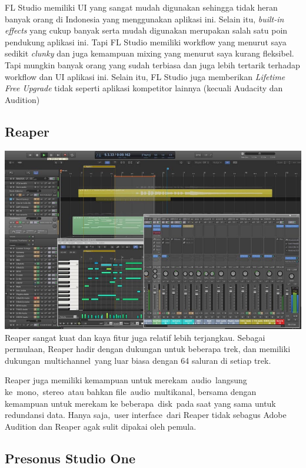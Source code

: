FL Studio memiliki UI yang sangat mudah digunakan sehingga tidak heran
banyak orang di Indonesia yang menggunakan aplikasi ini. Selain itu,
\emph{built-in effects} yang cukup banyak serta mudah digunakan
merupakan salah satu poin pendukung aplikasi ini. Tapi FL Studio
memiliki workflow yang menurut saya sedikit \emph{clunky} dan juga
kemampuan mixing yang menurut saya kurang fleksibel. Tapi mungkin banyak
orang yang sudah terbiasa dan juga lebih tertarik terhadap workflow dan
UI aplikasi ini. Selain itu, FL Studio juga memberikan \emph{Lifetime
Free Upgrade} tidak seperti aplikasi kompetitor lainnya (kecuali
Audacity dan Audition)

\hypertarget{reaper}{%
\subsection{Reaper}\label{reaper}}

\includegraphics{images/reaper.jpg} Reaper sangat kuat dan kaya fitur
juga relatif lebih terjangkau. Sebagai permulaan, Reaper hadir dengan
dukungan untuk beberapa trek, dan memiliki dukungan~multichannel~yang
luar biasa dengan 64 saluran di setiap trek.

Reaper juga memiliki kemampuan untuk merekam~audio~langsung
ke~mono,~stereo~atau bahkan file~audio~multikanal, bersama dengan
kemampuan untuk merekam ke beberapa~disk~pada saat yang sama untuk
redundansi data. Hanya saja,~user interface~dari Reaper tidak sebagus
Adobe Audition dan Reaper agak sulit dipakai oleh pemula.

\hypertarget{presonus-studio-one}{%
\subsection{Presonus Studio One}\label{presonus-studio-one}}

